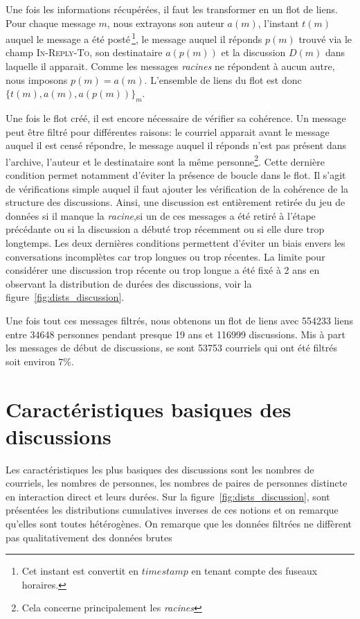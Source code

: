 Une fois les informations récupérées, il faut les transformer en un flot de liens.
Pour chaque message $m$, nous extrayons son auteur $a(m)$, l'instant $t(m)$ auquel le message a été posté\,\footnote{Cet instant est convertit en $timestamp$ en tenant compte des fuseaux horaires.}, le message auquel il réponds $p(m)$ trouvé via le champ \textsc{In-Reply-To}, son destinataire $a(p(m))$ et la discussion $D(m)$ dans laquelle il apparait.
Comme les messages \emph{racines} ne répondent à aucun autre, nous imposons $p(m)=a(m)$.
L'ensemble de liens du flot est donc $\{t(m),a(m),a(p(m))\}_m$.

Une fois le flot créé, il est encore nécessaire de vérifier sa cohérence.
Un message peut être filtré pour différentes raisons: le courriel apparait avant le message auquel il est censé répondre, le message auquel il réponds n'est pas présent dans l'archive, l'auteur et le destinataire sont la même personne\footnote{Cela concerne principalement les \emph{racines}}.
Cette dernière condition permet notamment d'éviter la présence de boucle dans le flot.
Il s'agit de vérifications simple auquel il faut ajouter les vérification de la cohérence de la structure des discussions.
Ainsi, une discussion est entièrement retirée du jeu de données si il manque la \emph{racine},si un de ces messages a été retiré à l'étape précédante ou si la discussion a débuté trop récemment ou si elle dure trop longtemps.
Les deux dernières conditions permettent d'éviter un biais envers les conversations incomplètes car trop longues ou trop récentes.
La limite pour considérer une discussion trop récente ou trop longue a été fixé à 2 ans en observant la distribution de durées des discussions, voir la figure~\ref{fig:dists_discussion}.

Une fois tout ces messages filtrés, nous obtenons un flot de liens avec 554233 liens entre 34648 personnes pendant presque 19 ans et 116999 discussions.
Mis à part les messages de début de discussions, se sont 53753 courriels qui ont été filtrés soit environ $7\%$.
\section{Caractéristiques basiques des discussions}

Les caractéristiques les plus basiques des discussions sont les nombres de courriels, les nombres de personnes, les nombres de paires de personnes distincte en interaction direct et leurs durées.
Sur la figure~\ref{fig:dists_discussion}, sont présentées les distributions cumulatives inverses de ces notions et on remarque qu'elles sont toutes hétérogènes.
On remarque que les données filtrées ne diffèrent pas qualitativement des données brutes

